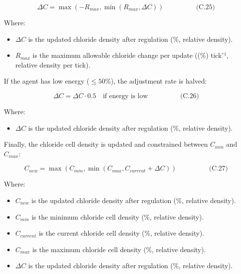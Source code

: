 \documentclass[
]{book}
\providecommand{\tightlist}{%
  \setlength{\itemsep}{0pt}\setlength{\parskip}{0pt}}
\begin{document}
\[
\begin{equation} \Delta C = \max\left(-R_{max}, \min(R_{max}, \Delta C)\right)  \hspace{2cm} \text{(C.25)} \end{equation}
\]

Where:

\begin{itemize}
\tightlist
\item
  \(\Delta C\) is the updated chloride density after regulation (\%,
  relative density).
\item
  \(R_{max}\) is the maximum allowable chloride change per update ((\%)
  tick⁻¹, relative density per tick).
\end{itemize}

If the agent has low energy (\(\leq 50\%\)), the adjustment rate is
halved:

\[
\begin{equation} \Delta C = \Delta C \cdot 0.5 \quad \text{if energy is low}  \hspace{2cm} \text{(C.26)} \end{equation}
\]

Where:

\begin{itemize}
\tightlist
\item
  \(\Delta C\) is the updated chloride density after regulation (\%,
  relative density).
\end{itemize}

Finally, the chloride cell density is updated and constrained between
\(C_{min}\) and \(C_{max}\):

\[
\begin{equation} C_{new} = \max(C_{min}, \min(C_{max}, C_{current} + \Delta C))  \hspace{2cm} \text{(C.27)} \end{equation}
\]

Where:

\begin{itemize}
\tightlist
\item
  \(C_{new}\) is the updated chloride density after regulation (\%,
  relative density).
\item
  \(C_{min}\) is the minimum chloride cell density (\%, relative
  density).
\item
  \(C_{current}\) is the current chloride cell density (\%, relative
  density).
\item
  \(C_{max}\) is the maximum chloride cell density (\%, relative
  density).
\item
  \(\Delta C\) is the updated chloride density after regulation (\%,
  relative density).
\end{itemize}
\end{document}
